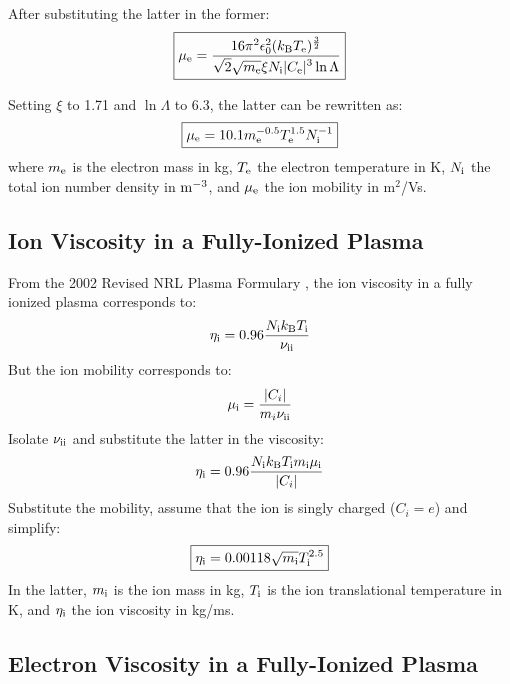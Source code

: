\documentclass{warpdoc}
\newcommand{\mfd}{\displaystyle}
\newcommand\frameeqn[1]{\fbox{$\displaystyle #1$}}
\begin{document}
After substituting the latter in the former:
%
\begin{equation}
\frameeqn{
 \mu_{\rm e} = \frac{16 \pi^2 \epsilon_0^2 (k_{\rm B} T_{\rm e})^\frac{3}{2}}{\mfd \sqrt{2}\sqrt{m_{\rm e}} \xi  N_{\rm i}  |C_{\rm e}|^3  \ln \Lambda}
}
\end{equation}
% 

Setting $\xi$ to 1.71 and $\ln \Lambda$ to 6.3, the latter can be rewritten as:
%
\begin{equation}
\frameeqn{
 \mu_{\rm e} = 10.1 m_{\rm e}^{-0.5} T_{\rm e}^{1.5} N_{\rm i}^{-1}
}
\end{equation}
% 
where $m_{\rm e}$ is the electron mass in kg, $T_{\rm e}$ the electron  temperature in K, $N_{\rm i}$ the total ion number density in $\rm m^{-3}$, and $\mu_{\rm e}$ the ion mobility in m$^2$/Vs.



\subsection{Ion Viscosity in a Fully-Ionized Plasma}

From the 2002 Revised NRL Plasma Formulary \cite{nrl:2002:huba}, the ion viscosity in a fully ionized plasma corresponds to:
%
\begin{equation}
\eta_{\rm i}= 0.96    \frac{N_{\rm i} k_{\rm B} T_{\rm i} }{\nu_{\rm ii}}
\end{equation}
%
But the ion mobility corresponds to:
%
\begin{equation}
 \mu_{\rm i} = \frac{|C_i|}{m_i \nu_{\rm ii}}
\end{equation}
%
Isolate $\nu_{\rm ii}$ and substitute the latter in the viscosity:
%
\begin{equation}
\eta_{\rm i}=  0.96  \frac{N_{\rm i} k_{\rm B} T_{\rm i} m_{\rm i} \mu_{\rm i}}{|C_i|}
\end{equation}
%
Substitute the mobility, assume that the ion is singly charged ($C_i=e$) and simplify:
%
\begin{equation}
\frameeqn{
\eta_{\rm i}=   0.00118  \sqrt{m_{\rm i}}   T_{\rm i}^{2.5}  
}
\end{equation}
%
In the latter, $m_{\rm i}$ is the ion mass in kg, $T_{\rm i}$ is the ion translational temperature in K, and $\eta_{\rm i}$ the ion viscosity in kg/ms. 



\subsection{Electron Viscosity in a Fully-Ionized Plasma}
\end{document}
